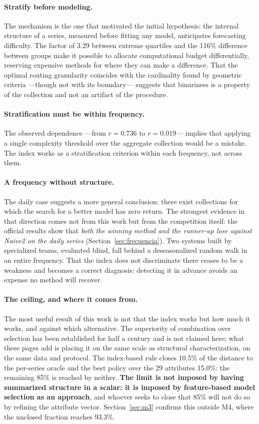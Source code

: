 \paragraph{Stratify before modeling.} The mechanism is the one that motivated the initial
hypothesis: the internal structure of a series, measured before fitting any model,
anticipates forecasting difficulty. The factor of 3.29 between extreme quartiles and the
116\% difference between groups make it possible to allocate computational budget
differentially, reserving expensive methods for where they can make a difference. That the
optimal routing granularity coincides with the cardinality found by geometric criteria
---though not with its boundary--- suggests that binariness is a property of the
collection and not an artifact of the procedure.

\paragraph{Stratification must be within frequency.} The observed dependence ---from
$r=0.736$ to $r=0.019$--- implies that applying a single complexity threshold over the
aggregate collection would be a mistake. The index works as a stratification criterion
within each frequency, not across them.

\paragraph{A frequency without structure.} The daily case suggests a more general
conclusion: there exist collections for which the search for a better model has zero
return. The strongest evidence in that direction comes not from this work but from the
competition itself: the official results show that \emph{both the winning method and the
runner-up lose against Naive2 on the daily series} (Section~\ref{sec:frecuencia}). Two
systems built by specialized teams, evaluated blind, fall behind a deseasonalized random
walk in an entire frequency. That the index does not discriminate there ceases to be a
weakness and becomes a correct diagnosis: detecting it in advance avoids an expense no
method will recover.

\paragraph{The ceiling, and where it comes from.} The most useful result of this work is
not that the index works but how much it works, and against which alternative. The
superiority of combination over selection has been established for half a century
\cite{bates1969,wang2023} and is not claimed here; what these pages add is placing it on
the same scale as structural characterization, on the same data and protocol. The
index-based rule closes 10.5\% of the distance to the per-series oracle and the best
policy over the 29 attributes 15.0\%: the remaining 85\% is reached by neither.
\textbf{The limit is not imposed by having summarized structure in a scalar: it is imposed
by feature-based model selection as an approach}, and whoever seeks to close that 85\%
will not do so by refining the attribute vector. Section~\ref{sec:m3} confirms this
outside M4, where the unclosed fraction reaches 93.3\%.

